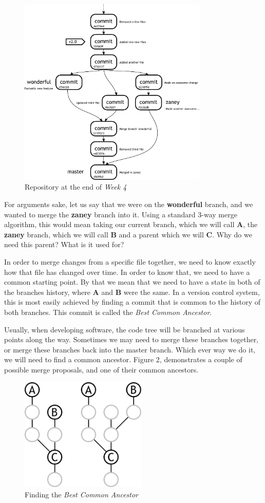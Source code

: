 \begin{figure}[hbt]
\centering
\includegraphics[width=9cm]{images/f-w4-d6.pdf}
\caption{Repository at the end of \emph{Week 4}}
\end{figure}

For arguments sake, let us say that we were on the \textbf{wonderful} branch, and we wanted to merge the \textbf{zaney} branch into it.  Using a standard 3-way merge algorithm, this would mean taking our current branch, which we will call \textbf{A}, the \textbf{zaney} branch, which we will call \textbf{B} and a parent which we will \textbf{C}.  Why do we need this parent?  What is it used for?

In order to merge changes from a specific file together, we need to know exactly how that file has changed over time.  In order to know that, we need to have a common starting point.  By that we mean that we need to have a state in both of the branches history, where \textbf{A} and \textbf{B} were the same.  In a version control system, this is most easily achieved by finding a commit that is common to the history of both branches.  This commit is called the \emph{Best Common Ancestor}.

Usually, when developing software, the code tree will be branched at various points along the way.  Sometimes we may need to merge these branches together, or merge these branches back into the master branch.  Which ever way we do it, we will need to find a common ancestor.  Figure 2, demonstrates a couple of possible merge proposals, and one of their common ancestors.

\begin{figure}[hbt]
\centering
\includegraphics[width=6cm]{images/f-af4-d2.pdf}
\caption{Finding the \emph{Best Common Ancestor}}
\end{figure}

